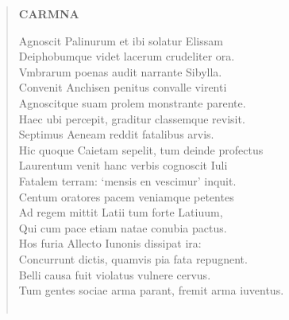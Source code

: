 \documentclass[11pt, a4paper]{report}
\begin{document}
\begin{verse}
    \begin{center} \textbf{CARMNA} \end{center} \marginpar{[10]} Agnoscit Palinurum et ibi solatur Elissam \\ Deiphobumque videt lacerum crudeliter ora. \\ Vmbrarum poenas audit narrante Sibylla. \\ Convenit Anchisen penitus convalle virenti \\ Agnoscitque suam prolem monstrante parente. \\ Haec ubi percepit, graditur classemque revisit. \\ Septimus Aeneam reddit fatalibus arvis. \\ Hic quoque Caietam sepelit, tum deinde profectus \\ Laurentum venit hanc verbis cognoscit Iuli \\ Fatalem terram: ‘mensis en vescimur’ inquit. \\ Centum oratores pacem veniamque petentes \\ Ad regem mittit Latii tum forte Latiuum, \\ Qui cum pace etiam natae conubia pactus. \\ Hos furia Allecto Iunonis dissipat ira: \\ Concurrunt dictis, quamvis pia fata repugnent. \\ Belli causa fuit violatus vulnere cervus. \\ Tum gentes sociae arma parant, fremit arma iuventus. \\ 
        ﻿\pagebreak 

\end{verse}
\end{document}
